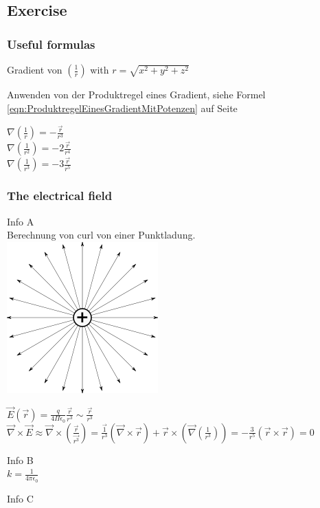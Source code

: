 \documentclass[a4paper]{scrartcl}
\begin{document}
\subsection{Exercise}
\subsubsection{Useful formulas}

Gradient von $ (\frac{1}{r}) $  with $ r=\sqrt{x^2+y^2+z^2} $

Anwenden von der Produktregel eines Gradient, siehe Formel \ref{eqn:ProduktregelEinesGradientMitPotenzen} auf Seite \pageref{eqn:ProduktregelEinesGradientMitPotenzen}

$ \nabla(\frac{1}{r}) = -\frac{\vec{r}}{r^3}$
\\
$ \nabla(\frac{1}{r^2}) = -2\frac{\vec{r}}{r^4}$
\\
$ \nabla(\frac{1}{r^3}) = -3\frac{\vec{r}}{r^5}$

\subsubsection{The electrical field}

Info A\\
Berechnung von curl von einer Punktladung.\\ \includegraphics[scale=0.2]{images/punktladung.png}
\label{fig:Punktladung}

$ \vec{E}(\vec{r})=\frac{q}{4\Pi\epsilon_0}\frac{\vec{r}}{r^3}\sim \frac{\vec{r}}{r^3} $
\\
$ \vec{\nabla}\times\vec{E}\approx\vec{\nabla}\times(\frac{\vec{r}}{\vec{r^3}})=\frac{\vec{1}}{r^3}(\vec{\nabla}\times\vec{r})+\vec{r}\times(\vec{\nabla}(\frac{1}{r^3}))=-\frac{3}{r^5}(\vec{r}\times\vec{r})=0 $

Info B\\
$ k=\frac{1}{4\pi\epsilon_0} $

Info C\\
\end{document}
